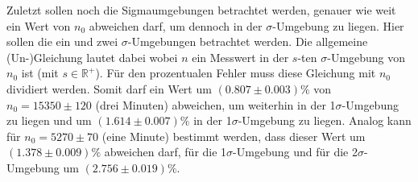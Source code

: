 Zuletzt sollen noch die Sigmaumgebungen betrachtet werden, genauer wie weit ein Wert von $n_0$ abweichen darf, um dennoch in der $\sigma$-Umgebung zu liegen. Hier sollen die ein und zwei $\sigma$-Umgebungen betrachtet werden. 
Die allgemeine (Un-)Gleichung lautet dabei
wobei $n$ ein Messwert in der $s$-ten $\sigma$-Umgebung von $n_0$ ist (mit $s \in \mathbb{R}^+$). Für den prozentualen Fehler muss diese Gleichung mit $n_0$ dividiert werden.
Somit darf ein Wert um $(0.807 \pm 0.003)\%$ von $n_0 = 15350 \pm 120$ (drei Minuten) abweichen, um weiterhin in der 1$\sigma$-Umgebung zu liegen und um $(1.614 \pm 0.007)\%$ in der 1$\sigma$-Umgebung zu liegen.
Analog kann für $n_0 = 5270 \pm 70$ (eine Minute) bestimmt werden, dass dieser Wert um $(1.378 \pm 0.009)\%$ abweichen darf, für die 1$\sigma$-Umgebung und für die 2$\sigma$-Umgebung um $(2.756 \pm 0.019)\%$.


